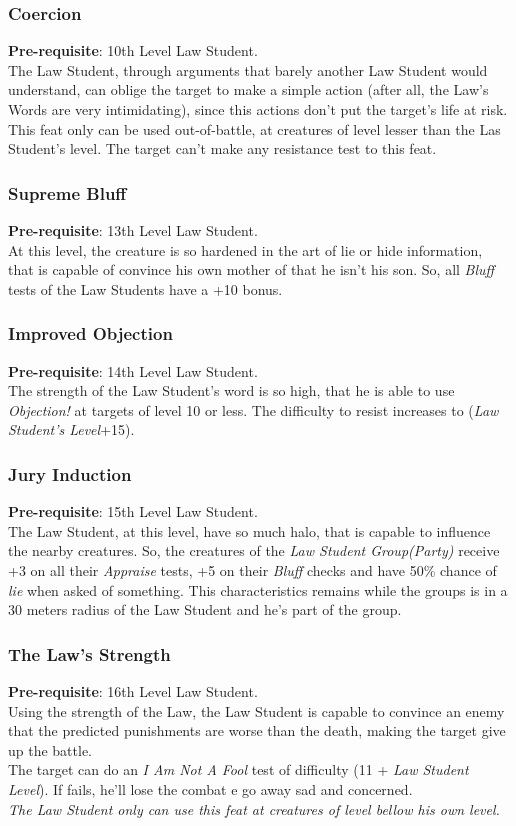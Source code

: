 \documentclass[ letterpaper,12pt]{article}
\begin{document}
\subsubsection{Coercion}
{\bf Pre-requisite}: 10th Level Law Student.\\
The Law Student, through arguments that barely another Law Student would understand, can oblige the target to make a simple action (after all, the Law's Words are very intimidating), since this actions don't put the target's life at risk. This feat only can be used out-of-battle, at creatures of level lesser than the Las Student's level. The target can't make any resistance test to this feat.

\subsubsection{Supreme Bluff}
{\bf Pre-requisite}: 13th Level Law Student.\\
At this level, the creature is so hardened in the art of lie or hide information, that is capable of convince his own mother of that he isn't his son. So, all {\it Bluff} tests of the Law Students have a +10 bonus.

\subsubsection{Improved Objection}
{\bf Pre-requisite}: 14th Level Law Student.\\
The strength of the Law Student's word is so high, that he is able to use {\it Objection!} at targets of level 10 or less. The difficulty to resist increases to ({\it Law Student's Level}+15).

\subsubsection{Jury Induction}
{\bf Pre-requisite}: 15th Level Law Student.\\
The Law Student, at this level, have so much halo, that is capable to influence the nearby creatures. So, the creatures of the {\it Law Student Group(Party)} receive +3 on all their {\it Appraise} tests, +5 on their {\it Bluff} checks and have 50\% chance of {\it lie} when asked of something. This characteristics remains while the groups is in a 30 meters radius of the Law Student and he's part of the group.

\subsubsection{The Law's Strength}
{\bf Pre-requisite}: 16th Level Law Student.\\
Using the strength of the Law, the Law Student is capable to convince an enemy that the predicted punishments are worse than the death, making the target give up the battle.\\
The target can do an {\it I Am Not A Fool} test of difficulty (11 + {\it Law Student Level}). If fails, he'll lose the combat e go away sad and concerned.\\
{\it The Law Student only can use this feat at creatures of level bellow his own level.}
\end{document}
